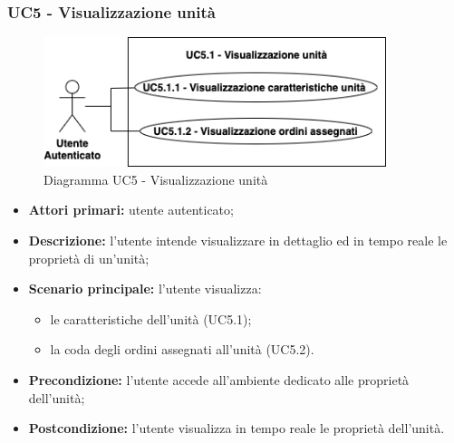 \subsubsection{UC5 - Visualizzazione unità}
    \begin{figure}[h!]
        \centering
        \includegraphics[width=10cm]{images/uc5.1.png}  
        \caption{Diagramma UC5 - Visualizzazione unità}
    \end{figure}
    \begin{itemize}
        \item \textbf{Attori primari:} utente autenticato;
        \item \textbf{Descrizione:} l'utente intende visualizzare in dettaglio ed in tempo reale le proprietà di un'unità;
        \item \textbf{Scenario principale:} l'utente visualizza:
        \begin{itemize}
            \item le caratteristiche dell'unità (UC5.1);
            \item la coda degli ordini assegnati all'unità (UC5.2).
        \end{itemize}
        \item \textbf{Precondizione:} l'utente accede all'ambiente dedicato alle proprietà dell'unità;
        \item \textbf{Postcondizione:} l'utente visualizza in tempo reale le proprietà dell'unità.
    \end{itemize}

